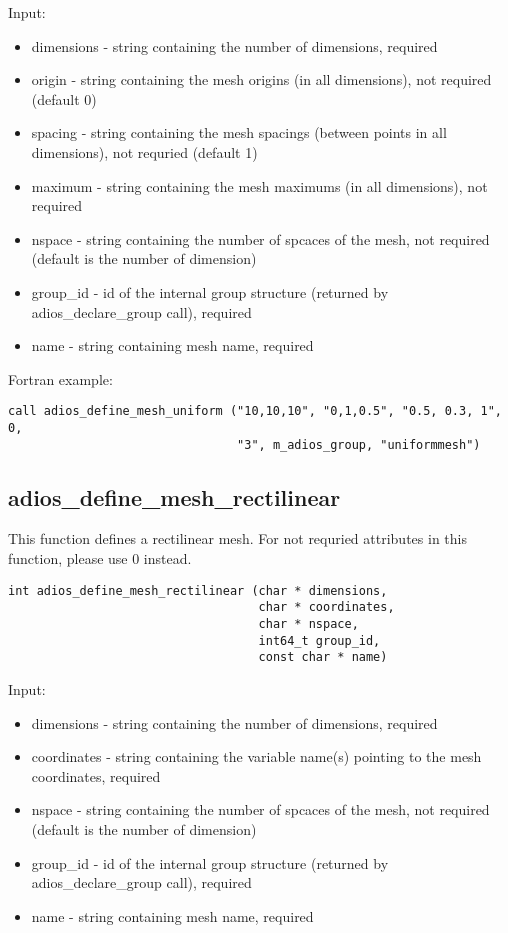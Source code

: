 Input:
\begin{itemize}
\item dimensions - string containing the number of dimensions, required
\item origin - string containing the mesh origins (in all dimensions), not required (default 0)
\item spacing - string containing the mesh spacings (between points in all dimensions), not requried (default 1)
\item maximum - string containing the mesh maximums (in all dimensions), not required
\item nspace - string containing the number of spcaces of the mesh, not required (default is the number of dimension)
\item group\_id - id of the internal group structure (returned by adios\_declare\_group call), required
\item name - string containing mesh name, required
\end{itemize}

Fortran example:
\begin{lstlisting}[alsolanguage=Fortran,caption={},label={}]
call adios_define_mesh_uniform ("10,10,10", "0,1,0.5", "0.5, 0.3, 1", 0, 
                                "3", m_adios_group, "uniformmesh")
\end{lstlisting}


\subsection{adios\_define\_mesh\_rectilinear}
This function defines a rectilinear mesh. For not requried attributes in this function, please use 0 instead.

\begin{lstlisting}[alsolanguage=Fortran,caption={},label={}]
int adios_define_mesh_rectilinear (char * dimensions,
                                   char * coordinates,
                                   char * nspace,
                                   int64_t group_id,
                                   const char * name)
\end{lstlisting}

Input:
\begin{itemize}
\item dimensions - string containing the number of dimensions, required
\item coordinates - string containing the variable name(s) pointing to the mesh coordinates, required
\item nspace - string containing the number of spcaces of the mesh, not required (default is the number of dimension)
\item group\_id - id of the internal group structure (returned by adios\_declare\_group call), required
\item name - string containing mesh name, required
\end{itemize}


